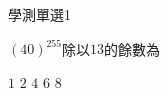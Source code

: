 \begin{QUESTIONS}
    \begin{QUESTION}
        \begin{ExamInfo}{85}{學測}{單選}{1}
        \end{ExamInfo}
        \begin{ExamAnsRateInfo}{}{}{}{}
        \end{ExamAnsRateInfo}
        \begin{QBODY}
            ${{\left( 40 \right)}^{255}}$除以$13$的餘數為
            \begin{QOPS} 
                \QOP$1$	
                \QOP$2$	
                \QOP$4$
                \QOP$6$	
                \QOP$8$
            \end{QOPS}
            

\end{QBODY}
\end{QUESTION}
\end{QUESTIONS}
